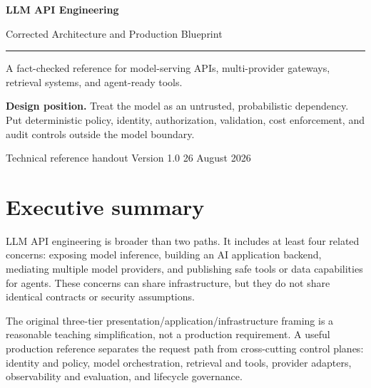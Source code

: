 \documentclass[10pt]{article}
\begin{document}
\hypersetup{pageanchor=false}
\begin{titlepage}
\pagecolor{navy}
\color{white}
\vspace*{0.75in}

{\sffamily\bfseries\fontsize{34}{39}\selectfont LLM API Engineering\par}
\vspace{0.18in}
{\sffamily\fontsize{20}{24}\selectfont Corrected Architecture and Production Blueprint\par}

\vspace{0.5in}
\noindent\textcolor{gold}{\rule{0.95\textwidth}{2pt}}

\vspace{0.4in}
{\large A fact-checked reference for model-serving APIs, multi-provider gateways, retrieval systems, and agent-ready tools.\par}

\vfill
\begin{tcolorbox}[
  colback=white,
  colframe=gold,
  coltext=navy,
  boxrule=0.7pt,
  arc=2mm,
  left=4mm,right=4mm,top=3mm,bottom=3mm
]
\sffamily
\textbf{Design position.} Treat the model as an untrusted, probabilistic dependency. Put deterministic policy, identity, authorization, validation, cost enforcement, and audit controls outside the model boundary.
\end{tcolorbox}

\vspace{0.35in}
{\sffamily\small Technical reference handout \textbullet{} Version 1.0 \textbullet{} 26 August 2026\par}
\end{titlepage}
\hypersetup{pageanchor=true}
\nopagecolor
\color{ink}

\section*{Executive summary}

LLM API engineering is broader than two paths. It includes at least four related concerns: exposing model inference, building an AI application backend, mediating multiple model providers, and publishing safe tools or data capabilities for agents. These concerns can share infrastructure, but they do not share identical contracts or security assumptions.

The original three-tier presentation/application/infrastructure framing is a reasonable teaching simplification, not a production requirement. A useful production reference separates the request path from cross-cutting control planes: identity and policy, model orchestration, retrieval and tools, provider adapters, observability and evaluation, and lifecycle governance.
\end{document}
